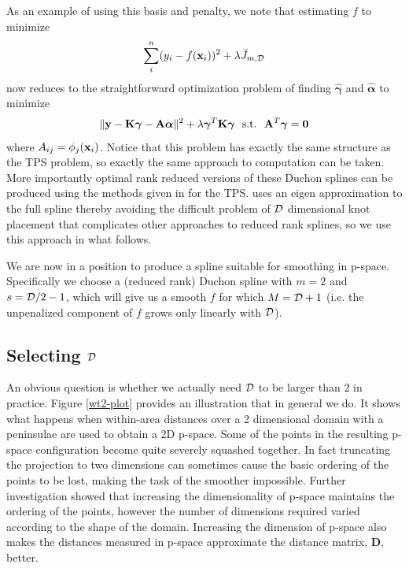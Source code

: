 \documentclass[smallextended]{svjour3}       %
\newcommand{\ts}{^T}
\begin{document}
As an example of using this basis and penalty, we note that estimating $f$ to minimize
$$
\sum_i^n (y_i - f({\bf x}_i))^2 + \lambda \breve{J}_{m,{\cal D}}
$$
now reduces to the straightforward optimization problem of finding $\hat {\bm \gamma} $ and $\hat {\bm \alpha}$ to minimize
$$
\|{\bf y} - {\bf K } {\bm \gamma} - {\bf A}{\bm \alpha}  \|^2 + \lambda {\bm \gamma}\ts {\bf K} {\bm \gamma} ~~\text{s.t.}~~{\bf A}\ts {\bm \gamma} = {\bf 0}
$$
where $A_{ij} = \phi_j({\bf x}_i)$. Notice that this problem has exactly the same structure as the TPS problem, so exactly the same approach to computation can be taken. More importantly optimal rank reduced versions of these Duchon splines can be produced using the methods given in \cite{Wood:2003tc} for the TPS. \cite{Wood:2003tc} uses an eigen approximation to the full spline thereby avoiding the difficult problem of $\cal D$ dimensional knot placement that complicates other approaches to reduced rank splines, so we use this approach in what follows.

We are now in a position to produce a spline suitable for smoothing in p-space. Specifically we choose a (reduced rank) Duchon spline with $m=2$ and $s = {\cal D}/2 - 1$, which will give us a smooth $f$ for which $M={\cal D}+1$ (i.e. the unpenalized component of $f$ grows only linearly with $\cal D$).

\subsection{Selecting $\cal D$}
\label{s:mdsdimselect}

An obvious question is whether we actually need $\cal D$ to be larger than 2 in practice. Figure \ref{wt2-plot} provides an illustration that in general we do. It shows what happens when within-area distances over a 2 dimensional domain with a peninsulae are used to obtain a 2D p-space. Some of the points in the resulting p-space configuration become quite severely squashed together. In fact truncating the projection to two dimensions can sometimes cause the basic ordering of the points to be lost, making the task of the smoother impossible. Further investigation showed that increasing the dimensionality of p-space maintains the ordering of the points, however the number of dimensions required varied according to the shape of the domain. Increasing the dimension of p-space also makes the distances measured in p-space approximate the distance matrix, $\mathbf{D}$, better.
\end{document}
